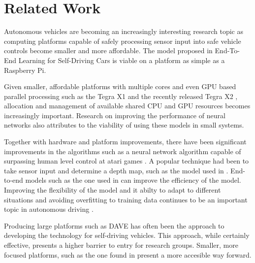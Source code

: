 \section{Related Work}\label{sec:related}

Autonomous vehicles are becoming an increasingly interesting research topic as computing platforms capable of safely processing sensor input into safe vehicle controls become smaller and more affordable.  The model proposed in End-To-End Learning for Self-Driving Cars \cite{Bojarski2016} is viable on a platform as simple as a Raspberry Pi.

Given smaller, affordable platforms with multiple cores and even GPU based parallel processing such as the Tegra X1 \cite{NVIDIA2015} and the recently released Tegra X2 \cite{Amert2017}, allocation and management of available shared CPU and GPU resources \cite{Kim2016} becomes increasingly important.  Research on improving the performance of neural networks \cite{Jouppi2017} also attributes to the viability of using these models in small systems.

Together with hardware and platform improvements, there have been significant improvements in the algorithms such as a neural network algorithm capable of surpassing human level control at atari games \cite{DBLP}.  A popular technique had been to take sensor input and determine a depth map, such as the model used in \cite{Michels:2005}. End-to-end models such as the one used in \cite{Bojarski2016} can improve the efficiency of the model.  Improving the flexibility of the model and it abilty to adapt to different situations and avoiding overfitting to training data continues to be an important topic in autonomous driving \cite{Pomerleau1989}.

Producing large platforms such as DAVE \cite{LeCun:04} has often been the approach to developing the technology for self-driving vehicles.  This approach, while certainly effective, presents a higher barrier to entry for research groups.  Smaller, more focused platforms, such as the one found in \cite{Michels:2005} present a more accesible way forward.
